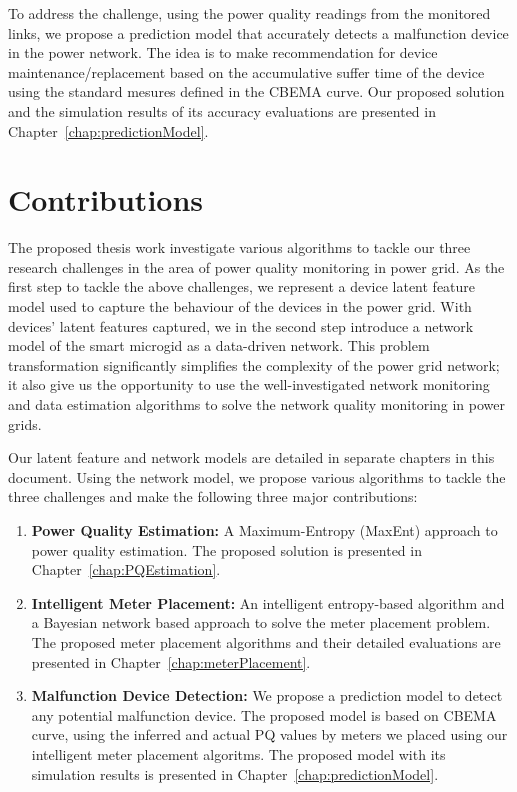 To address the challenge, using the power quality readings from the monitored links, we propose a prediction model that accurately detects a malfunction device in the power network. The idea is to make recommendation for device maintenance/replacement based on the accumulative suffer time of the device using the standard mesures defined in the CBEMA curve. Our proposed solution and the simulation results of its accuracy evaluations are presented in Chapter~\ref{chap:predictionModel}.

\section{Contributions}
The proposed thesis work investigate various algorithms to tackle our three research challenges in the area of power quality monitoring in power grid. As the first step to tackle the above challenges, we represent a device latent feature model used to capture the behaviour of the devices in the power grid. With devices' latent features captured, we in the second step introduce a network model of the smart microgid as a data-driven network. This problem transformation significantly simplifies the complexity of the power grid network; it also give us the opportunity to use the well-investigated network monitoring and data estimation algorithms to solve the network quality monitoring in power grids.

Our latent feature and network models are detailed in separate chapters in this document. Using the network model, we propose various algorithms to tackle the three challenges and make the following three major contributions:

\begin{enumerate}
\item \textbf{Power Quality Estimation:} A Maximum-Entropy (MaxEnt) approach to power quality estimation. The proposed solution is presented in Chapter~\ref{chap:PQEstimation}.
\item \textbf{Intelligent Meter Placement:} An intelligent entropy-based algorithm and a Bayesian network based approach to solve the meter placement problem. The proposed meter placement algorithms and their detailed evaluations are presented in Chapter~\ref{chap:meterPlacement}.
\item \textbf{Malfunction Device Detection:} We propose a prediction model to detect any potential malfunction device. The proposed model is based on CBEMA curve, using the inferred and actual PQ values by meters we placed using our intelligent meter placement algoritms. The proposed model with its simulation results is presented in Chapter~\ref{chap:predictionModel}.
\end{enumerate}

